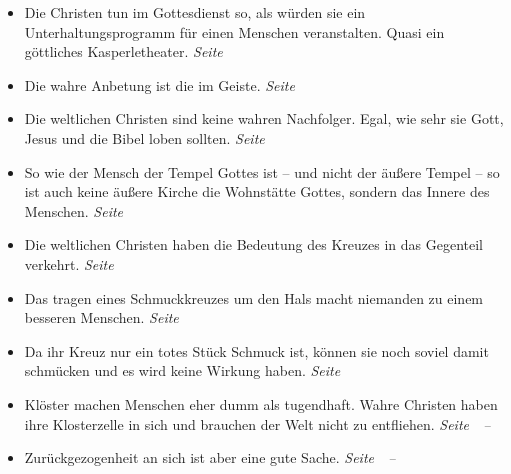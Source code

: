 \begin{itemize}
\begin{itemize}

 \item Die Christen tun im Gottesdienst so, als würden sie ein
Unterhaltungsprogramm
 für einen Menschen veranstalten. Quasi ein göttliches Kasperletheater.
 \dotfill \textit{Seite~\pageref{ref:05_02_kasperletheater}}\\

 \item Die wahre Anbetung ist die im Geiste.
 \dotfill \textit{Seite~\pageref{ref:05_04_wahre_anbetung}}\\

 \item Die weltlichen Christen sind keine wahren Nachfolger. Egal, wie sehr sie
Gott, Jesus und die Bibel loben sollten.
 \dotfill \textit{Seite~\pageref{ref:05_05_wahre_nachfolge}}\\

 \item So wie der Mensch der Tempel Gottes ist -- und nicht der äußere Tempel
-- so ist auch keine äußere Kirche die Wohnstätte Gottes, sondern das Innere des
Menschen.
 \dotfill \textit{Seite~\pageref{ref:05_06_tempel}}\\

 \item Die weltlichen Christen haben die Bedeutung des Kreuzes in das Gegenteil
verkehrt.
 \dotfill \textit{Seite~\pageref{ref:05_07_kreuz}}\\

 \item Das tragen eines Schmuckkreuzes um den Hals macht niemanden zu einem
besseren Menschen.
 \dotfill \textit{Seite~\pageref{ref:05_08_kreuz}}\\

 \item Da ihr Kreuz nur ein totes Stück Schmuck ist, können sie noch soviel
damit schmücken und es wird keine Wirkung haben.
 \dotfill \textit{Seite~\pageref{ref:05_09_kreuz}}\\

 \item Klöster machen Menschen eher dumm als tugendhaft. Wahre Christen haben ihre
Klosterzelle in sich und brauchen der Welt nicht zu entfliehen.
 \dotfill \textit{Seite~\pageref{ref:05_11_kloster}~--~\pageref{ref:05_11_kloster_ende}}\\

 \item Zurückgezogenheit an sich ist aber eine gute Sache.
 \dotfill \textit{Seite~\pageref{ref:05_13_zurueckgezogenheit}~--~\pageref{ref:05_13_zurueckgezogenheit_ende}}\\


\end{itemize}
\end{itemize}
